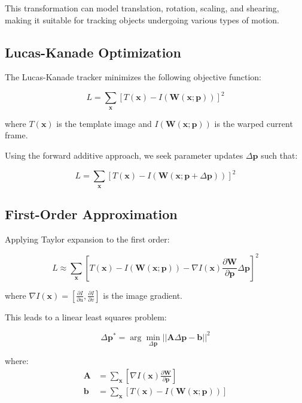 \documentclass[12pt,a4paper]{article}
\begin{document}
This transformation can model translation, rotation, scaling, and shearing, making it suitable for tracking objects undergoing various types of motion.

\subsection{Lucas-Kanade Optimization}

The Lucas-Kanade tracker minimizes the following objective function:

\begin{equation}
L = \sum_{\mathbf{x}} [T(\mathbf{x}) - I(\mathbf{W}(\mathbf{x}; \mathbf{p}))]^2
\end{equation}

where $T(\mathbf{x})$ is the template image and $I(\mathbf{W}(\mathbf{x}; \mathbf{p}))$ is the warped current frame.

Using the forward additive approach, we seek parameter updates $\Delta\mathbf{p}$ such that:

\begin{equation}
L = \sum_{\mathbf{x}} [T(\mathbf{x}) - I(\mathbf{W}(\mathbf{x}; \mathbf{p} + \Delta\mathbf{p}))]^2
\end{equation}

\subsection{First-Order Approximation}

Applying Taylor expansion to the first order:

\begin{equation}
L \approx \sum_{\mathbf{x}} \left[T(\mathbf{x}) - I(\mathbf{W}(\mathbf{x}; \mathbf{p})) - \nabla I(\mathbf{x}) \frac{\partial \mathbf{W}}{\partial \mathbf{p}} \Delta\mathbf{p}\right]^2
\end{equation}

where $\nabla I(\mathbf{x}) = [\frac{\partial I}{\partial u}, \frac{\partial I}{\partial v}]$ is the image gradient.

This leads to a linear least squares problem:

\begin{equation}
\Delta\mathbf{p}^* = \arg\min_{\Delta\mathbf{p}} ||\mathbf{A}\Delta\mathbf{p} - \mathbf{b}||^2
\end{equation}

where:
\begin{align}
\mathbf{A} &= \sum_{\mathbf{x}} \left[\nabla I(\mathbf{x}) \frac{\partial \mathbf{W}}{\partial \mathbf{p}}\right] \\
\mathbf{b} &= \sum_{\mathbf{x}} [T(\mathbf{x}) - I(\mathbf{W}(\mathbf{x}; \mathbf{p}))]
\end{align}
\end{document}
